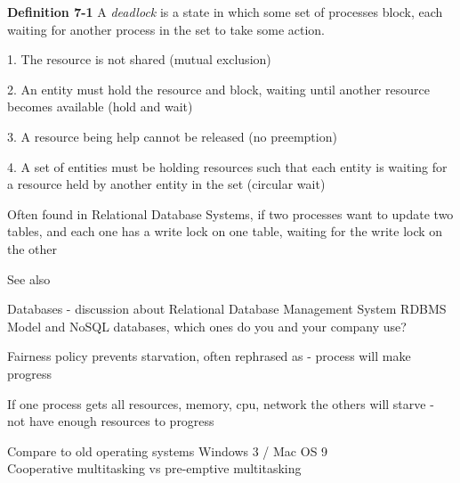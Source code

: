 \documentclass[Screen16to9,17pt]{foils}
\begin{document}
\begin{list1}
\item {\bf Definition 7-1} A \emph{deadlock} is a state in which some set of processes block, each waiting for another process in the set to take some action.
\begin{list2}
\item[1.] The resource is not shared (mutual exclusion)
\item[2.] An entity must hold the resource and block, waiting until another resource becomes available (hold and wait)
\item[3.] A resource being help cannot be released (no preemption)
\item[4.] A set of entities must be holding resources such that each entity is waiting for a resource held by another entity in the set (circular wait)
\end{list2}
\item Often found in Relational Database Systems, if two processes want to update two tables, and each one has a write lock on one table, waiting for the write lock on the other
\item See also 
\end{list1}


Databases - discussion about Relational Database Management System RDBMS Model and NoSQL databases, which ones do you and your company use?


\begin{list1}
\item Fairness policy prevents starvation, often rephrased as - process will make progress
\item If one process gets all resources, memory, cpu, network the others will starve - not have enough resources to progress
\item Compare to old operating systems Windows 3 / Mac OS 9\\
Cooperative multitasking vs pre-emptive multitasking
\end{list1}

\end{document}
